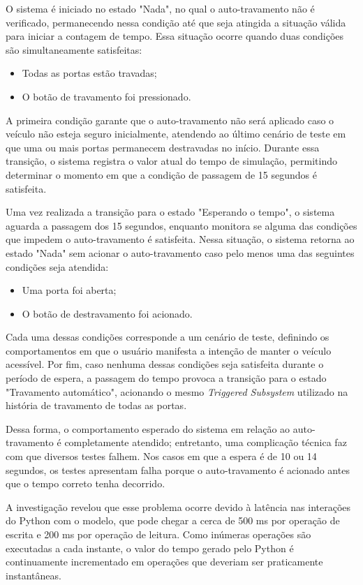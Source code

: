 O sistema é iniciado no estado "Nada", no qual o auto-travamento não é verificado, permanecendo nessa condição até que seja atingida a situação válida para iniciar 
a contagem de tempo. Essa situação ocorre quando duas condições são simultaneamente satisfeitas:

\begin{itemize}
	\item Todas as portas estão travadas;
	\item O botão de travamento foi pressionado.
\end{itemize}

A primeira condição garante que o auto-travamento não será aplicado caso o veículo não esteja seguro inicialmente, atendendo ao último cenário de teste em que uma 
ou mais portas permanecem destravadas no início. Durante essa transição, o sistema registra o valor atual do tempo de simulação, permitindo determinar o momento em 
que a condição de passagem de 15 segundos é satisfeita.

Uma vez realizada a transição para o estado "Esperando o tempo", o sistema aguarda a passagem dos 15 segundos, enquanto monitora se alguma das condições que impedem 
o auto-travamento é satisfeita. Nessa situação, o sistema retorna ao estado "Nada" sem acionar o auto-travamento caso pelo menos uma das seguintes condições seja atendida:
\begin{itemize}
	\item Uma porta foi aberta;
	\item O botão de destravamento foi acionado.
\end{itemize}

Cada uma dessas condições corresponde a um cenário de teste, definindo os comportamentos em que o usuário manifesta a intenção de manter o veículo acessível. Por fim, 
caso nenhuma dessas condições seja satisfeita durante o período de espera, a passagem do tempo provoca a transição para o estado "Travamento automático", acionando 
o mesmo \textit{Triggered Subsystem} utilizado na história de travamento de todas as portas.

Dessa forma, o comportamento esperado do sistema em relação ao auto-travamento é completamente atendido; entretanto, uma complicação técnica faz com que diversos 
testes falhem. Nos casos em que a espera é de 10 ou 14 segundos, os testes apresentam falha porque o auto-travamento é acionado antes que o tempo correto tenha decorrido.

A investigação revelou que esse problema ocorre devido à latência nas interações do Python com o modelo, que pode chegar a cerca de 500 ms por operação de escrita e 
200 ms por operação de leitura. Como inúmeras operações são executadas a cada instante, o valor do tempo gerado pelo Python é continuamente incrementado em operações 
que deveriam ser praticamente instantâneas.

